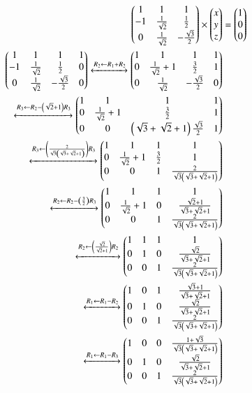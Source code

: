 \documentclass[journal]{IEEEtran}
\begin{document}
\begin{align}
  \begin{pmatrix}1 & 1 & 1\\-1 & \frac{1}{\sqrt{2}} & \frac{1}{2}\\0 & \frac{1}{\sqrt{2}} & -\frac{\sqrt{3}}{2}\end{pmatrix}\times\begin{pmatrix}x\\y\\z\end{pmatrix}&=\begin{pmatrix}1\\0\\0\end{pmatrix}\\
  \begin{pmatrix}1 & 1 & 1 & 1\\-1 & \frac{1}{\sqrt{2}} & \frac{1}{2} & 0\\0 & \frac{1}{\sqrt{2}} & -\frac{\sqrt{3}}{2} & 0\end{pmatrix} \xleftrightarrow[]{R_2 \leftarrow {R_1+R_2}}\begin{pmatrix}1 & 1 & 1 & 1\\0 & \frac{1}{\sqrt{2}}+1 & \frac{3}{2} & 1\\0 & \frac{1}{\sqrt{2}} & -\frac{\sqrt{3}}{2} & 0\end{pmatrix}\\
  \xleftrightarrow[]{R_3 \leftarrow {R_2-\ensuremath{\left(\sqrt{2}+1\right)}R_3}}\begin{pmatrix}1 & 1 & 1 & 1\\0 & \frac{1}{\sqrt{2}}+1 & \frac{3}{2} & 1\\0 & 0 & \left(\sqrt{3}+\sqrt{2}+1\right)\frac{\sqrt{3}}{2} & 1\end{pmatrix}\\
  \xleftrightarrow[]{R_3 \leftarrow {\ensuremath{\left(\frac{2}{\sqrt{3}\left(\sqrt{3}+\sqrt{2}+1\right)}\right)}R_3}}\begin{pmatrix}1 & 1 & 1 & 1\\0 & \frac{1}{\sqrt{2}}+1 & \frac{3}{2} & 1\\0 & 0 & 1 & \frac{2}{\sqrt{3}\left(\sqrt{3}+\sqrt{2}+1\right)}\end{pmatrix}\\
  \xleftrightarrow[]{R_2 \leftarrow {R_2-\ensuremath{\left(\frac{3}{2}\right)}R_3}}\begin{pmatrix}1 & 1 & 1 & 1\\0 & \frac{1}{\sqrt{2}}+1 & 0 & \frac{\sqrt{2}+1}{\sqrt{3}+\sqrt{2}+1}\\0 & 0 & 1 & \frac{2}{\sqrt{3}\left(\sqrt{3}+\sqrt{2}+1\right)}\end{pmatrix}\\
  \xleftrightarrow[]{R_2 \leftarrow \ensuremath{\left(\frac{\sqrt{2}}{\sqrt{2}+1}\right)}R_2}\begin{pmatrix}1 & 1 & 1 & 1\\0 & 1 & 0 & \frac{\sqrt{2}}{\sqrt{3}+\sqrt{2}+1}\\0 & 0 & 1 & \frac{2}{\sqrt{3}\left(\sqrt{3}+\sqrt{2}+1\right)}\end{pmatrix}\\
  \xleftrightarrow[]{R_1 \leftarrow R_1-R_2}\begin{pmatrix}1 & 0 & 1 & \frac{\sqrt{3}+1}{\sqrt{3}+\sqrt{2}+1}\\0 & 1 & 0 & \frac{\sqrt{2}}{\sqrt{3}+\sqrt{2}+1}\\0 & 0 & 1 & \frac{2}{\sqrt{3}\left(\sqrt{3}+\sqrt{2}+1\right)}\end{pmatrix}\\
  \xleftrightarrow[]{R_1 \leftarrow R_1-R_3}\begin{pmatrix}1 & 0 & 0 & \frac{1+\sqrt{3}}{\sqrt{3}\left(\sqrt{3}+\sqrt{2}+1\right)}\\0 & 1 & 0 & \frac{\sqrt{2}}{\sqrt{3}+\sqrt{2}+1}\\0 & 0 & 1 & \frac{2}{\sqrt{3}\left(\sqrt{3}+\sqrt{2}+1\right)}\end{pmatrix}\\
\end{align}
\end{document}
